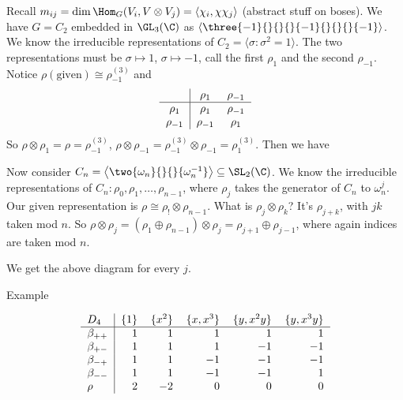 

Recall $m_{ij}= \dim \Hom_G(V_i, V \otimes V_j)= \langle \chi_i, \chi\chi_j \rangle$ (abstract stuff on boses). We have $G=C_2$ embedded in $\GL_3(\C)$ as $\left\langle \three{-1}{}{}{}{-1}{}{}{}{-1} \right\rangle$. We know the irreducible representations of $C_2= \langle \sigma \colon \sigma^2=1\rangle$. The two representations must be $\sigma \mapsto 1$, $ \sigma \mapsto -1$, call the first $\rho_1$ and the second $\rho_{-1}$. Notice $\rho(\text{given}) \cong \rho_{-1}^{(3)}$ and 
	\[
	\begin{tabular}{c|cc}
	& $\rho_1$ & $\rho_{-1}$ \\ \hline
	$\rho_1$ & $\rho_1$ & $\rho_{-1}$ \\
	$\rho_{-1}$ & $\rho_{-1}$ & $\rho_1$ 
	\end{tabular}
	\]
So $\rho \otimes \rho_1= \rho = \rho_{-1}^{(3)}$, $\rho \otimes \rho_{-1} = \rho_{-1}^{(3)} \otimes \rho_{-1} = \rho_1^{(3)}$. Then we have


Now consider $C_n= \left\langle \two{\omega_n}{}{}{\omega_n^{-1}} \right\rangle \subseteq \SL_2(\C)$. We know the irreducible representations of $C_n: \rho_0,\rho_1,\ldots,\rho_{n-1}$, where $\rho_j$ takes the generator of $C_n$ to $\omega_n^j$. Our given representation is $\rho \cong \rho_! \otimes \rho_{n-1}$. What is $\rho_j \otimes \rho_k$? It's $\rho_{j+k}$, with $jk$ taken mod $n$. So $\rho \otimes \rho_j= (\rho_1 \oplus \rho_{n-1}) \otimes \rho_j= \rho_{j+1} \oplus \rho_{j-1}$, where again indices are taken mod $n$. 



We get the above diagram for every $j$. 




Example

	\[
	\begin{tabular}{l |rrrrr}
	$D_4$ & $\{1\}$ & $\{x^2\}$ & $\{x,x^3\}$ & $\{y,x^2y\}$ & $\{y,x^3y\}$ \\ \hline
	$\beta_{++}$ & 1 & 1 & 1 & 1 & 1 \\
	$\beta_{+-}$ & 1 & 1 & 1 & $-1$ & $-1$ \\
	$\beta_{-+}$ & 1 & 1 & $-1$ & $-1$ & $-1$ \\
	$\beta_{--}$ & 1 & 1 & $-1$ & $-1$ & 1 \\
	$\rho$ & 2 & $-2$ & 0 & 0 & 0 
	\end{tabular}
	\]


